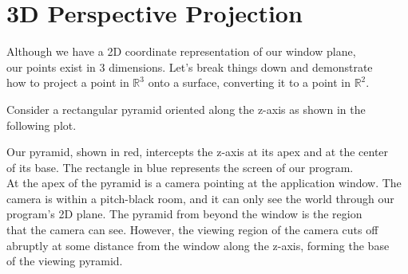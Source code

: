 \documentclass[11.pt]{article}
\begin{document}
\setcounter{section}{1}
\section{3D Perspective Projection}

Although we have a 2D coordinate representation of our window plane,\\
our points exist in 3 dimensions. Let's break things down and demonstrate\\
how to project a point in $\mathbb{R}^3$ onto a surface, converting it to
a point in $\mathbb{R}^2$.

Consider a rectangular pyramid oriented along the z-axis as shown in the\\
following plot.\\


Our pyramid, shown in red, intercepts the z-axis at its apex and at the center\\
of its base. The rectangle in blue represents the screen of our program.\\

At the apex of the pyramid is a camera pointing at the application window.
The camera is within a pitch-black room, and it can only see the world 
through our program's 2D plane. The pyramid from beyond the window is the region\\
that the camera can see. However, the viewing region of the camera cuts off\\
abruptly at some distance from the window along the z-axis, forming the base\\
of the viewing pyramid.\\
\end{document}
